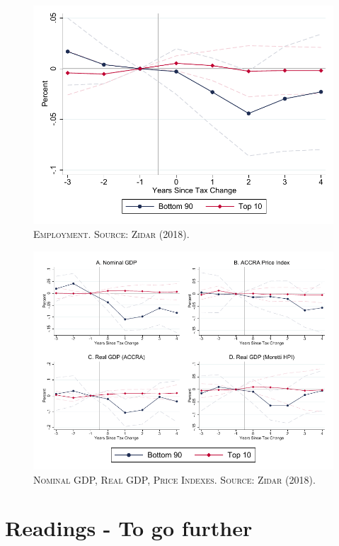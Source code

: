 \documentclass[]{book}
\begin{document}
\begin{figure}

{\centering \includegraphics[width=0.8\linewidth,height=0.8\textheight]{figures/Zidar2017/fig3B} 

}

\caption{\textsc{Employment. Source: Zidar (2018).}}\label{fig:zidar2017-fig3B}
\end{figure}




\begin{figure}

{\centering \includegraphics[width=0.8\linewidth,height=0.8\textheight]{figures/Zidar2017/fig4} 

}

\caption{\textsc{Nominal GDP, Real GDP, Price Indexes.
Source: Zidar (2018).}}\label{fig:zidar2017-fig4}
\end{figure}

\section*{Readings - To go further}\label{readings---to-go-further-13}
\end{document}
